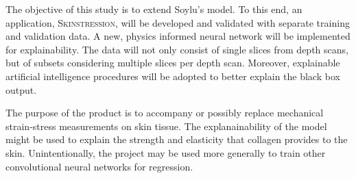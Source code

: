 The objective of this study is to extend Soylu's model.
To this end, an application, \textsc{Skinstression}, will be developed and validated with separate training and validation data.
A new, physics informed neural network will be implemented for explainability.
The data will not only consist of single slices from depth scans, but of subsets considering multiple slices per depth scan.
Moreover, explainable artificial intelligence procedures will be adopted to better explain the black box output.

The purpose of the product is to accompany or possibly replace mechanical strain-stress measurements on skin tissue.
The explanainability of the model might be used to explain the strength and elasticity that collagen provides to the skin.
Unintentionally, the project may be used more generally to train other convolutional neural networks for regression.
